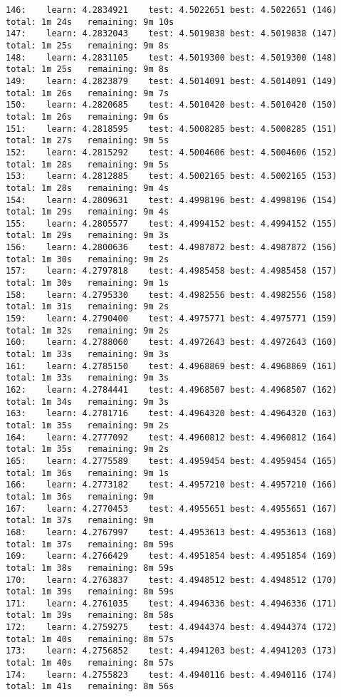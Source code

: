 \documentclass[11pt]{article}
\begin{document}
\begin{Verbatim}[commandchars=\\\{\}]
146:	learn: 4.2834921	test: 4.5022651	best: 4.5022651 (146)	total: 1m 24s	remaining: 9m 10s
147:	learn: 4.2832043	test: 4.5019838	best: 4.5019838 (147)	total: 1m 25s	remaining: 9m 8s
148:	learn: 4.2831105	test: 4.5019300	best: 4.5019300 (148)	total: 1m 25s	remaining: 9m 8s
149:	learn: 4.2823879	test: 4.5014091	best: 4.5014091 (149)	total: 1m 26s	remaining: 9m 7s
150:	learn: 4.2820685	test: 4.5010420	best: 4.5010420 (150)	total: 1m 26s	remaining: 9m 6s
151:	learn: 4.2818595	test: 4.5008285	best: 4.5008285 (151)	total: 1m 27s	remaining: 9m 5s
152:	learn: 4.2815292	test: 4.5004606	best: 4.5004606 (152)	total: 1m 28s	remaining: 9m 5s
153:	learn: 4.2812885	test: 4.5002165	best: 4.5002165 (153)	total: 1m 28s	remaining: 9m 4s
154:	learn: 4.2809631	test: 4.4998196	best: 4.4998196 (154)	total: 1m 29s	remaining: 9m 4s
155:	learn: 4.2805577	test: 4.4994152	best: 4.4994152 (155)	total: 1m 29s	remaining: 9m 3s
156:	learn: 4.2800636	test: 4.4987872	best: 4.4987872 (156)	total: 1m 30s	remaining: 9m 2s
157:	learn: 4.2797818	test: 4.4985458	best: 4.4985458 (157)	total: 1m 30s	remaining: 9m 1s
158:	learn: 4.2795330	test: 4.4982556	best: 4.4982556 (158)	total: 1m 31s	remaining: 9m 2s
159:	learn: 4.2790400	test: 4.4975771	best: 4.4975771 (159)	total: 1m 32s	remaining: 9m 2s
160:	learn: 4.2788060	test: 4.4972643	best: 4.4972643 (160)	total: 1m 33s	remaining: 9m 3s
161:	learn: 4.2785150	test: 4.4968869	best: 4.4968869 (161)	total: 1m 33s	remaining: 9m 3s
162:	learn: 4.2784441	test: 4.4968507	best: 4.4968507 (162)	total: 1m 34s	remaining: 9m 3s
163:	learn: 4.2781716	test: 4.4964320	best: 4.4964320 (163)	total: 1m 35s	remaining: 9m 2s
164:	learn: 4.2777092	test: 4.4960812	best: 4.4960812 (164)	total: 1m 35s	remaining: 9m 2s
165:	learn: 4.2775589	test: 4.4959454	best: 4.4959454 (165)	total: 1m 36s	remaining: 9m 1s
166:	learn: 4.2773182	test: 4.4957210	best: 4.4957210 (166)	total: 1m 36s	remaining: 9m
167:	learn: 4.2770453	test: 4.4955651	best: 4.4955651 (167)	total: 1m 37s	remaining: 9m
168:	learn: 4.2767997	test: 4.4953613	best: 4.4953613 (168)	total: 1m 37s	remaining: 8m 59s
169:	learn: 4.2766429	test: 4.4951854	best: 4.4951854 (169)	total: 1m 38s	remaining: 8m 59s
170:	learn: 4.2763837	test: 4.4948512	best: 4.4948512 (170)	total: 1m 39s	remaining: 8m 59s
171:	learn: 4.2761035	test: 4.4946336	best: 4.4946336 (171)	total: 1m 39s	remaining: 8m 58s
172:	learn: 4.2759275	test: 4.4944374	best: 4.4944374 (172)	total: 1m 40s	remaining: 8m 57s
173:	learn: 4.2756852	test: 4.4941203	best: 4.4941203 (173)	total: 1m 40s	remaining: 8m 57s
174:	learn: 4.2755823	test: 4.4940116	best: 4.4940116 (174)	total: 1m 41s	remaining: 8m 56s

\end{Verbatim}
\end{document}
